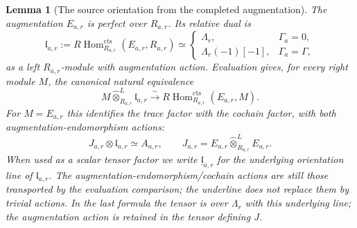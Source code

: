 \documentclass[11pt]{article}
\newtheorem{lemma}[proposition]{Lemma}
\theoremstyle{definition}
\theoremstyle{remark}
\newcommand{\RHom}{R\operatorname{Hom}}
\begin{document}
\begin{lemma}[The source orientation from the completed augmentation]
\label{lem:root-source-orientation}
The augmentation $E_{a,r}$ is perfect over $R_{a,r}$.  Its relative
dual is
\[
 \mathfrak l_{a,r}:=\RHom_{R_{a,r}}^{\mathrm{cts}}(E_{a,r},R_{a,r})
 \simeq
 \begin{cases}
 \Lambda_r,&\Gamma_a=0,\\
 \Lambda_r(-1)[-1],&\Gamma_a=\Gamma,
 \end{cases}
\]
as a left $R_{a,r}$-module with augmentation action.  Evaluation gives,
for every right module $M$, the canonical natural equivalence
\begin{equation}
 M\widehat\otimes_{R_{a,r}}^L\mathfrak l_{a,r}
  \xrightarrow{\sim}\RHom_{R_{a,r}}^{\mathrm{cts}}(E_{a,r},M).
 \label{eq:root-oriented-evaluation}
\end{equation}
For $M=E_{a,r}$ this identifies the trace factor with the cochain
factor, with both augmentation-endomorphism actions:
\[
 J_{a,r}\otimes\mathfrak l_{a,r}\simeq A_{a,r},\qquad
 J_{a,r}=E_{a,r}\widehat\otimes_{R_{a,r}}^L E_{a,r}.
\]
When used as a scalar tensor factor we write
$\underline{\mathfrak l}_{a,r}$ for the underlying orientation line
of $\mathfrak l_{a,r}$.  The augmentation-endomorphism/cochain actions
are still those transported by the evaluation comparison; the
underline does not replace them by trivial actions.  In the last
formula the tensor is over $\Lambda_r$ with this underlying line;
the augmentation action is retained in the tensor defining $J$.
\end{lemma}
\end{document}
